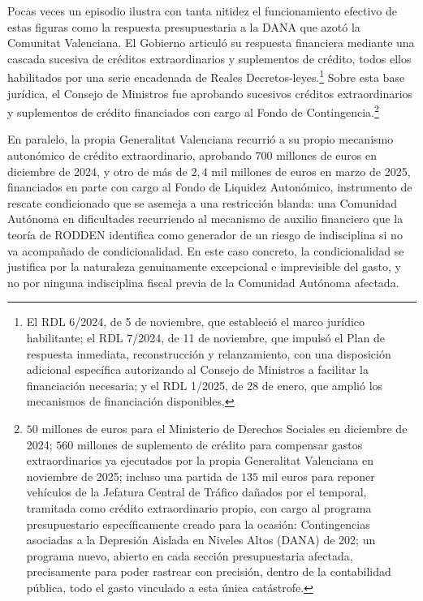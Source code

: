 \documentclass[10pt,a4paper]{article}
\begin{document}
Pocas veces un episodio ilustra con tanta nitidez el funcionamiento efectivo de estas figuras como la respuesta presupuestaria a la DANA que azotó la Comunitat Valenciana. El Gobierno articuló su respuesta financiera mediante una cascada sucesiva de créditos extraordinarios y suplementos de crédito, todos ellos habilitados por una serie encadenada de Reales Decretos-leyes.\footnote{%
    El RDL 6/2024, de 5 de noviembre, que estableció el marco jurídico habilitante; el RDL 7/2024, de 11 de noviembre, que impulsó el Plan de respuesta inmediata, reconstrucción y relanzamiento, con una disposición adicional específica autorizando al Consejo de Ministros a facilitar la financiación necesaria; y el RDL 1/2025, de 28 de enero, que amplió los mecanismos de financiación disponibles.
} Sobre esta base jurídica, el Consejo de Ministros fue aprobando sucesivos créditos extraordinarios y suplementos de crédito financiados con cargo al Fondo de Contingencia.\footnote{%
    $50$ millones de euros para el Ministerio de Derechos Sociales en diciembre de 2024; $560$ millones de suplemento de crédito para compensar gastos extraordinarios ya ejecutados por la propia Generalitat Valenciana en noviembre de 2025; incluso una partida de $135$ mil euros para reponer vehículos de la Jefatura Central de Tráfico dañados por el temporal, tramitada como crédito extraordinario propio, con cargo al programa presupuestario específicamente creado para la ocasión: Contingencias asociadas a la Depresión Aislada en Niveles Altos (DANA) de 202; un programa nuevo, abierto en cada sección presupuestaria afectada, precisamente para poder rastrear con precisión, dentro de la contabilidad pública, todo el gasto vinculado a esta única catástrofe.
}

En paralelo, la propia Generalitat Valenciana recurrió a su propio mecanismo autonómico de crédito extraordinario, aprobando $700$ millones de euros en diciembre de 2024, y otro de más de $2,4$ mil millones de euros en marzo de 2025, financiados en parte con cargo al Fondo de Liquidez Autonómico, instrumento de rescate condicionado que se asemeja a una restricción blanda: una Comunidad Autónoma en dificultades recurriendo al mecanismo de auxilio financiero que la teoría de RODDEN identifica como generador de un riesgo de indisciplina si no va acompañado de condicionalidad. En este caso concreto, la condicionalidad se justifica por la naturaleza genuinamente excepcional e imprevisible del gasto, y no por ninguna indisciplina fiscal previa de la Comunidad Autónoma afectada.
\end{document}
